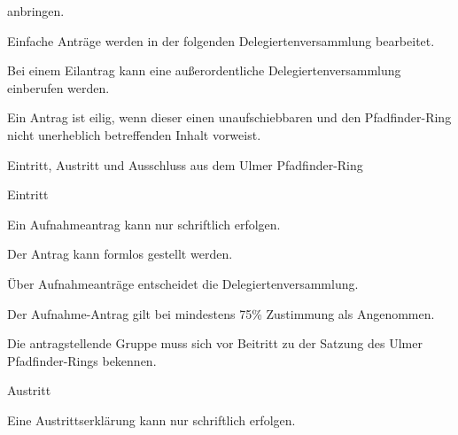 \begin{legal}
\begin{legal}
\begin{legal}
                          anbringen.
                    \item Einfache Anträge werden in der folgenden Delegiertenversammlung 
                          bearbeitet.
                    \item Bei einem Eilantrag kann eine außerordentliche Delegiertenversammlung 
                          einberufen werden.
                        \begin{legal}
                            \item Ein Antrag ist eilig, wenn dieser einen unaufschiebbaren und den 
                                  Pfadfinder-Ring nicht unerheblich betreffenden Inhalt vorweist.
                        \end{legal}
                \end{legal}
        \end{legal}
    \item Eintritt, Austritt und Ausschluss aus dem Ulmer Pfadfinder-Ring
        \begin{legal}
            \item Eintritt
                \begin{legal}
                    \item Ein Aufnahmeantrag kann nur schriftlich erfolgen.
                        \begin{legal}
                            \item Der Antrag kann formlos gestellt werden.
                        \end{legal}
                    \item Über Aufnahmeanträge entscheidet die Delegiertenversammlung.
                        \begin{legal}
                            \item Der Aufnahme-Antrag gilt bei mindestens 75\% Zustimmung als 
                                  Angenommen.
                        \end{legal}
                    \item Die antragstellende Gruppe muss sich vor Beitritt zu der Satzung des 
                          Ulmer Pfadfinder-Rings bekennen.
                \end{legal}
            \item Austritt
                \begin{legal}
                    \item Eine Austrittserklärung kann nur schriftlich erfolgen.

\end{legal}
\end{legal}
\end{legal}
